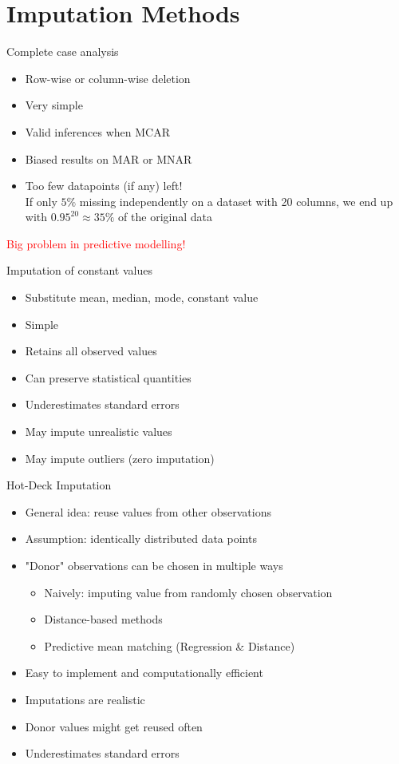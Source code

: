 \documentclass[aspectratio=43]{beamer}
\newcommand\pro{\item[$+$]}
\newcommand\con{\item[$-$]}
\begin{document}
\section{Imputation Methods}

\begin{frame}{Complete case analysis}
\begin{itemize}
\item Row-wise or column-wise deletion
\end{itemize}
\begin{itemize}
\pro Very simple
\pro Valid inferences when MCAR
\end{itemize}
\begin{itemize}
\con Biased results on MAR or MNAR
\con Too few datapoints (if any) left!\\
If only $5\%$ missing independently on a dataset with 20 columns, we end up with $0.95^{20} \approx 35\%$ of the original data\\
\end{itemize}
\textcolor{red}{Big problem in predictive modelling!}
\end{frame}

\begin{frame}{Imputation of constant values}
\begin{itemize}
\item Substitute mean, median, mode, constant value
\end{itemize}
\begin{itemize}
\pro Simple
\pro Retains all observed values
\pro Can preserve statistical quantities
\end{itemize}
\begin{itemize}
\con Underestimates standard errors
\con May impute unrealistic values
\con May impute outliers (zero imputation)
\end{itemize}
\end{frame}

\begin{frame}{Hot-Deck Imputation}
\begin{itemize}
	\item General idea: reuse values from other observations
	\item Assumption: identically distributed data points
	\item "Donor" observations can be chosen in multiple ways
	\begin{itemize}
		\item Naively: imputing value from randomly chosen observation
		\item Distance-based methods
		\item Predictive mean matching (Regression \& Distance)
	\end{itemize}
\end{itemize}
\begin{itemize}
	\pro Easy to implement and computationally efficient
	\pro Imputations are realistic
\end{itemize}
\begin{itemize}
	\con Donor values might get reused often
	\con Underestimates standard errors
\end{itemize}
\end{frame}
\end{document}
